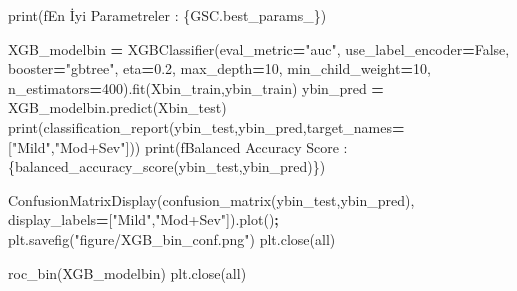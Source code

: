 \documentclass[12pt,twoside]{deuthesis}
\newenvironment{Shaded}{\begin{snugshade}}{\end{snugshade}}
\newcommand{\BuiltInTok}[1]{#1}
\newcommand{\DecValTok}[1]{\textcolor[rgb]{0.00,0.00,0.81}{#1}}
\newcommand{\FloatTok}[1]{\textcolor[rgb]{0.00,0.00,0.81}{#1}}
\newcommand{\NormalTok}[1]{#1}
\newcommand{\OperatorTok}[1]{\textcolor[rgb]{0.81,0.36,0.00}{\textbf{#1}}}
\newcommand{\SpecialCharTok}[1]{\textcolor[rgb]{0.00,0.00,0.00}{#1}}
\newcommand{\SpecialStringTok}[1]{\textcolor[rgb]{0.31,0.60,0.02}{#1}}
\newcommand{\StringTok}[1]{\textcolor[rgb]{0.31,0.60,0.02}{#1}}
\newcommand{\VariableTok}[1]{\textcolor[rgb]{0.00,0.00,0.00}{#1}}
\begin{document}
\begin{Shaded}
\begin{Highlighting}[]
\BuiltInTok{print}\NormalTok{(}\SpecialStringTok{f\textquotesingle{}En İyi Parametreler : }\SpecialCharTok{\{}\NormalTok{GSC}\SpecialCharTok{.}\NormalTok{best\_params\_}\SpecialCharTok{\}}\SpecialStringTok{\textquotesingle{}}\NormalTok{)}
\end{Highlighting}
\end{Shaded}
\begin{Shaded}
\begin{Highlighting}[]
\NormalTok{XGB\_modelbin }\OperatorTok{=}\NormalTok{ XGBClassifier(eval\_metric}\OperatorTok{=}\StringTok{"auc"}\NormalTok{,}
\NormalTok{                             use\_label\_encoder}\OperatorTok{=}\VariableTok{False}\NormalTok{,}
\NormalTok{                             booster}\OperatorTok{=}\StringTok{"gbtree"}\NormalTok{,}
\NormalTok{                             eta}\OperatorTok{=}\FloatTok{0.2}\NormalTok{,}
\NormalTok{                             max\_depth}\OperatorTok{=}\DecValTok{10}\NormalTok{,}
\NormalTok{                             min\_child\_weight}\OperatorTok{=}\DecValTok{10}\NormalTok{,}
\NormalTok{                             n\_estimators}\OperatorTok{=}\DecValTok{400}\NormalTok{).fit(Xbin\_train,ybin\_train)}
\NormalTok{ybin\_pred }\OperatorTok{=}\NormalTok{ XGB\_modelbin.predict(Xbin\_test)}
\BuiltInTok{print}\NormalTok{(classification\_report(ybin\_test,ybin\_pred,target\_names}\OperatorTok{=}\NormalTok{[}\StringTok{"Mild"}\NormalTok{,}\StringTok{"Mod+Sev"}\NormalTok{]))}
\BuiltInTok{print}\NormalTok{(}\SpecialStringTok{f\textquotesingle{}Balanced Accuracy Score : }\SpecialCharTok{\{}\NormalTok{balanced\_accuracy\_score(ybin\_test,ybin\_pred)}\SpecialCharTok{\}}\SpecialStringTok{\textquotesingle{}}\NormalTok{)}
\end{Highlighting}
\end{Shaded}
\begin{Shaded}
\begin{Highlighting}[]
\NormalTok{ConfusionMatrixDisplay(confusion\_matrix(ybin\_test,ybin\_pred),}
\NormalTok{                       display\_labels}\OperatorTok{=}\NormalTok{[}\StringTok{"Mild"}\NormalTok{,}\StringTok{"Mod+Sev"}\NormalTok{]).plot()}\OperatorTok{;}
\NormalTok{plt.savefig(}\StringTok{"figure/XGB\_bin\_conf.png"}\NormalTok{)}
\NormalTok{plt.close(}\StringTok{\textquotesingle{}all\textquotesingle{}}\NormalTok{)}
\end{Highlighting}
\end{Shaded}
\begin{Shaded}
\begin{Highlighting}[]
\NormalTok{roc\_bin(XGB\_modelbin)}
\NormalTok{plt.close(}\StringTok{\textquotesingle{}all\textquotesingle{}}\NormalTok{)}
\end{Highlighting}
\end{Shaded}
\normalsize
\end{document}
